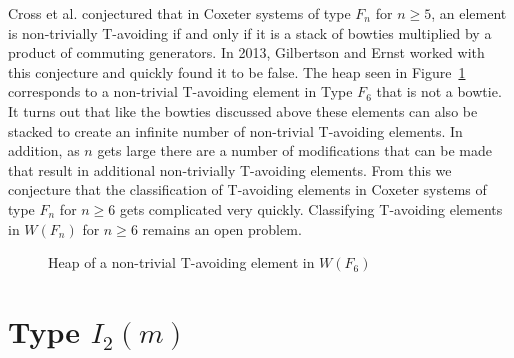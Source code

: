 Cross et al. conjectured that in Coxeter systems of type $F_n$ for $n \geq 5$, an element is non-trivially T-avoiding if and only if it is a stack of bowties multiplied by a product of commuting generators. In 2013, Gilbertson and Ernst worked with this conjecture and quickly found it to be false. The heap seen in Figure~\ref{fig:f6bat} corresponds to a non-trivial T-avoiding element in Type $F_6$ that is not a bowtie. It turns out that like the bowties discussed above these elements can also be stacked to create an infinite number of non-trivial T-avoiding elements. In addition, as $n$ gets large there are a number of modifications that can be made that result in additional non-trivially T-avoiding elements. From this we conjecture that the classification of T-avoiding elements in Coxeter systems of type $F_n$ for $n \geq 6$ gets complicated very quickly. Classifying T-avoiding elements in $W(F_n)$ for $n \geq 6$ remains an open problem. 

\begin{figure}[h!]\centering
{}
\caption{Heap of a non-trivial T-avoiding element in $W(F_6)$}\label{fig:f6bat}
\end{figure}


\section{Type $I_2(m)$}

